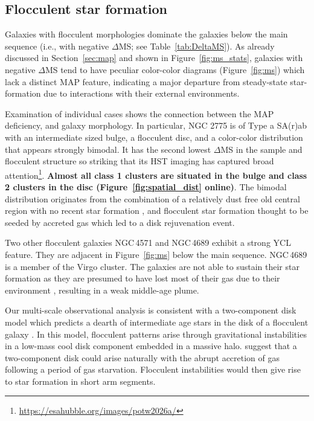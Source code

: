 \documentclass[linenumbers]{aastex63}
\begin{document}
\subsection{Flocculent star formation} \label{sect:flocculent}


Galaxies with flocculent morphologies dominate the galaxies below the main sequence (i.e., with negative $\Delta$MS; see Table~\ref{tab:DeltaMS}). As already discussed in Section~\ref{sec:map} and shown in Figure~\ref{fig:ms_stats}, galaxies with negative $\Delta$MS tend to have peculiar color-color diagrams (Figure~\ref{fig:ms}) which lack a distinct MAP feature, indicating a major departure from steady-state star-formation due to interactions with their external environments. 

Examination of individual cases shows the connection between the MAP deficiency, and galaxy morphology. In particular, NGC 2775 is of Type a SA(r)ab with an intermediate sized bulge, a flocculent disc, and a color-color distribution that appears strongly bimodal.  It has the second lowest $\Delta$MS in the sample and flocculent structure so striking that its HST imaging has captured broad attention\footnote{\url{https://esahubble.org/images/potw2026a/}}. \textbf{Almost all class 1 clusters are situated in the bulge and class 2 clusters in the disc (Figure~\ref{fig:spatial_dist} online)}. The bimodal distribution originates from the combination of a relatively dust free old central region with no recent star formation \citep{hogg_hot_2001}, and flocculent star formation thought to be seeded by accreted gas \citep[i.e., from the nearby companion NGC\,2777,][]{arp_properties_1991} which led to a disk rejuvenation event. 

Two other flocculent galaxies NGC\,4571 \citep{kennicutt_evolution_1983} and NGC\,4689 \citep{elmegreen_arm_2002} exhibit a strong YCL feature. They are adjacent in Figure~\ref{fig:ms} below the main sequence.  NGC\,4689 is a member of the Virgo cluster. The galaxies are not able to sustain their star formation as they are presumed to have lost most of their gas due to their environment \citep{kenney_co_1986}, resulting in a weak middle-age plume.

Our multi-scale observational analysis is consistent with a two-component disk model which predicts a dearth of intermediate age stars in the disk of a flocculent galaxy \citep{ET93,SM22}.  In this model, flocculent patterns arise through gravitational instabilities in a low-mass cool disk component embedded in a massive halo. \citet{SM22} suggest that a two-component disk could arise naturally with the abrupt accretion of gas following a period of gas starvation. Flocculent instabilities would then give rise to star formation in short arm segments. 
\end{document}
